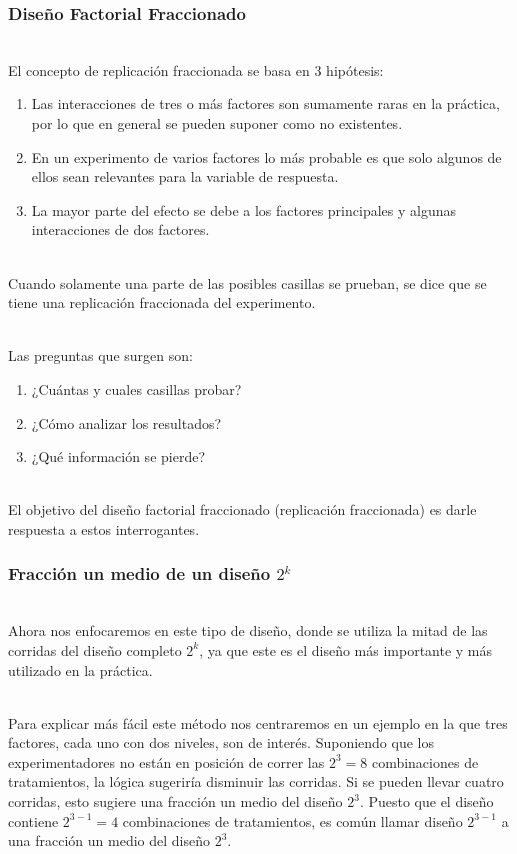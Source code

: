 \documentclass[12pt]{beamer}
\begin{document}
\begin{frame}
\frametitle{Diseño Factorial Fraccionado}
~\\El concepto de replicación fraccionada se  basa en 3 hipótesis:

\begin{enumerate}[1.]
    \item Las interacciones de tres o más factores son sumamente raras en la práctica, por lo que en general se pueden suponer como no existentes.
    \item En un experimento de varios factores lo más probable es que solo algunos de ellos sean relevantes para la variable de respuesta.
    \item La mayor parte del efecto se debe a los factores principales y algunas interacciones de dos factores.
\end{enumerate}
\end{frame}

\begin{frame}
~\\Cuando solamente una parte de las posibles casillas se prueban, se dice que se tiene una replicación fraccionada del experimento.

~\\Las preguntas que surgen son:

\begin{enumerate}[1.]
    \item ¿Cuántas y cuales casillas probar?
    \item ¿Cómo analizar los resultados?
    \item ¿Qué información se pierde?
\end{enumerate}

~\\El objetivo del diseño factorial fraccionado (replicación fraccionada) es darle respuesta a estos interrogantes.

\end{frame}

\begin{frame}
\frametitle{Fracción un medio de un diseño $ 2^{k} $}
~\\Ahora nos enfocaremos en este tipo de diseño, donde se utiliza la mitad de las corridas del diseño completo $2^k$, ya que este es el diseño más importante y más utilizado en la práctica.

~\\Para explicar más fácil este método nos centraremos en un ejemplo en la que tres factores, cada uno con dos niveles, son de interés. Suponiendo que los experimentadores no están en posición de correr las $2^3=8$ combinaciones de tratamientos, la lógica sugeriría disminuir las corridas. Si se pueden llevar cuatro corridas, esto sugiere una fracción un medio del diseño $2^3$. Puesto que el diseño contiene $2^{3-1}=4$ combinaciones de tratamientos, es común llamar diseño $2^{3-1}$ a una fracción un medio del diseño $2^3$.
\end{frame}
\end{document}
